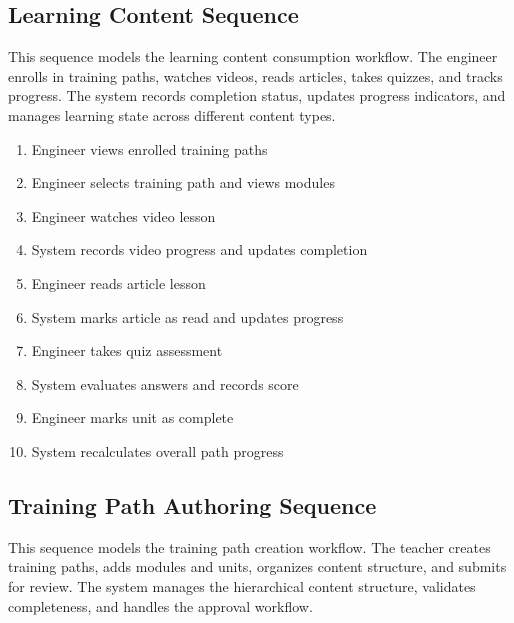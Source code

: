 
\subsection{Learning Content Sequence}
This sequence models the learning content consumption workflow. The engineer
enrolls in training paths, watches videos, reads articles, takes quizzes, and
tracks progress. The system records completion status, updates progress
indicators, and manages learning state across different content types.

\begin{enumerate}[topsep=0pt,itemsep=1pt,parsep=0pt,partopsep=0pt]
    \item Engineer views enrolled training paths
    \item Engineer selects training path and views modules
    \item Engineer watches video lesson
    \item System records video progress and updates completion
    \item Engineer reads article lesson
    \item System marks article as read and updates progress
    \item Engineer takes quiz assessment
    \item System evaluates answers and records score
    \item Engineer marks unit as complete
    \item System recalculates overall path progress
\end{enumerate}


\subsection{Training Path Authoring Sequence}
This sequence models the training path creation workflow. The teacher creates
training paths, adds modules and units, organizes content structure, and
submits for review. The system manages the hierarchical content structure,
validates completeness, and handles the approval workflow.

